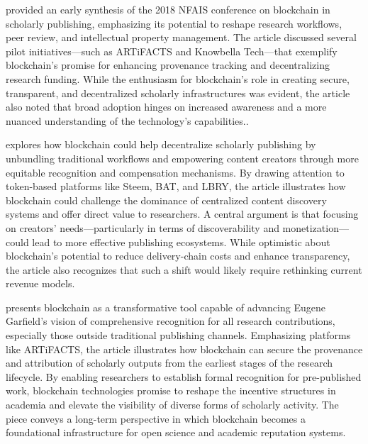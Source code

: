 
\cite{lawlor_overview_2018} provided an early synthesis of the 2018 NFAIS conference on blockchain in scholarly publishing, emphasizing its potential to reshape research workflows, peer review, and intellectual property management. The article discussed several pilot initiatives—such as ARTiFACTS and Knowbella Tech—that exemplify blockchain’s promise for enhancing provenance tracking and decentralizing research funding. While the enthusiasm for blockchain's role in creating secure, transparent, and decentralized scholarly infrastructures was evident, the article also noted that broad adoption hinges on increased awareness and a more nuanced understanding of the technology's capabilities..

\cite{holmen_blockchain_2018} explores how blockchain could help decentralize scholarly publishing by unbundling traditional workflows and empowering content creators through more equitable recognition and compensation mechanisms. By drawing attention to token-based platforms like Steem, BAT, and LBRY, the article illustrates how blockchain could challenge the dominance of centralized content discovery systems and offer direct value to researchers. A central argument is that focusing on creators' needs—particularly in terms of discoverability and monetization—could lead to more effective publishing ecosystems. While optimistic about blockchain’s potential to reduce delivery-chain costs and enhance transparency, the article also recognizes that such a shift would likely require rethinking current revenue models.

\cite{kochalko_making_2019} presents blockchain as a transformative tool capable of advancing Eugene Garfield’s vision of comprehensive recognition for all research contributions, especially those outside traditional publishing channels. Emphasizing platforms like ARTiFACTS, the article illustrates how blockchain can secure the provenance and attribution of scholarly outputs from the earliest stages of the research lifecycle. By enabling researchers to establish formal recognition for pre-published work, blockchain technologies promise to reshape the incentive structures in academia and elevate the visibility of diverse forms of scholarly activity. The piece conveys a long-term perspective in which blockchain becomes a foundational infrastructure for open science and academic reputation systems.

